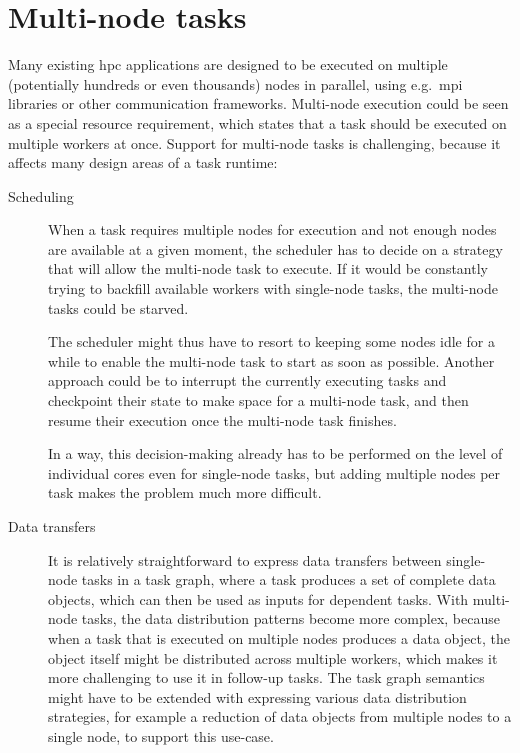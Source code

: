 \section{Multi-node tasks}
Many existing \gls{hpc} applications are designed to be executed on multiple
(potentially hundreds or even thousands) nodes in parallel, using e.g.\ \gls{mpi}
libraries or other communication frameworks. Multi-node execution could be seen as a special
resource requirement, which states that a task should be executed on multiple workers at once.
Support for multi-node tasks is challenging, because it affects many design areas of a task
runtime:
\begin{description}
    \item[Scheduling] When a task requires multiple nodes for execution and not enough nodes are available at a given
    moment, the scheduler has to decide on a strategy that will allow the multi-node task to execute.
    If it would be constantly trying to backfill available workers with single-node tasks, the
    multi-node tasks could be starved.

    The scheduler might thus have to resort to keeping some nodes idle for a while to enable the
    multi-node task to start as soon as possible. Another approach could be to interrupt the currently
    executing tasks and checkpoint their state to make space for a multi-node task, and then resume
    their execution once the multi-node task finishes.

    In a way, this decision-making already has to be performed on the level of individual cores even
    for single-node tasks, but adding multiple nodes per task makes the problem much more difficult.
    \item[Data transfers] It is relatively straightforward to express data transfers between single-node tasks in a task
    graph, where a task produces a set of complete data objects, which can then be used as inputs for
    dependent tasks. With multi-node tasks, the data distribution patterns become more complex, because
    when a task that is executed on multiple nodes produces a data object, the object itself might be
    distributed across multiple workers, which makes it more challenging to use it in follow-up tasks.
    The task graph semantics might have to be extended with expressing various data distribution
    strategies, for example a reduction of data objects from multiple nodes to a single node, to
    support this use-case.


\end{description}
